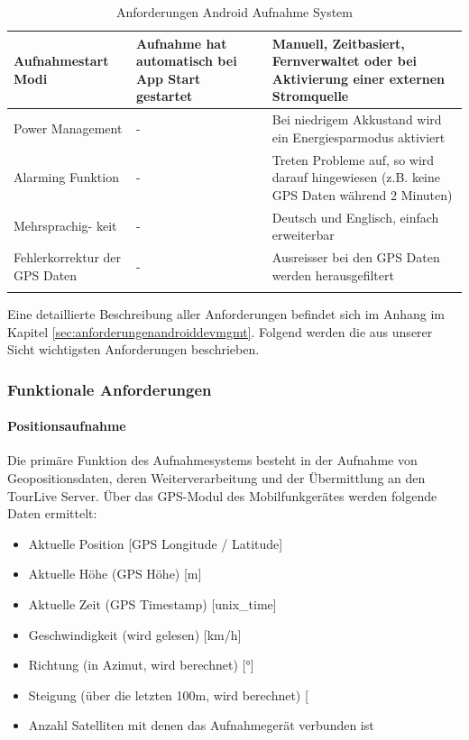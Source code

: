 {\begin{longtable}{  p{3.5cm} | p{4.3cm} | p{4.3cm} }
    \hline 
    Aufnahmestart Modi & Aufnahme hat automatisch bei App Start gestartet & Manuell, Zeitbasiert, Fernverwaltet oder bei Aktivierung einer externen Stromquelle\\
    \hline 
   	Power Management & - & Bei niedrigem Akkustand wird ein Energiesparmodus aktiviert\\
    \hline 
    Alarming Funktion & - & Treten Probleme auf, so wird darauf hingewiesen (z.B. keine GPS Daten w\"{a}hrend 2 Minuten)\\
    \hline 
    Mehrsprachig- keit & - & Deutsch und Englisch, einfach erweiterbar\\
    \hline 
    Fehlerkorrektur der GPS Daten & - & Ausreisser bei den GPS Daten werden herausgefiltert\\
    
    
\caption{Anforderungen Android Aufnahme System}
\end{longtable}}

Eine detaillierte Beschreibung aller Anforderungen befindet sich im Anhang im Kapitel \ref{sec:anforderungenandroiddevmgmt}. Folgend werden die aus unserer Sicht wichtigsten Anforderungen beschrieben.

\subsubsection{Funktionale Anforderungen}
\paragraph{Positionsaufnahme}
Die primäre Funktion des Aufnahmesystems besteht in der Aufnahme von Geopositionsdaten, deren Weiterverarbeitung und der Übermittlung an den TourLive Server. Über das GPS-Modul des Mobilfunkgerätes werden folgende Daten ermittelt:
\begin{itemize}
\item Aktuelle Position [GPS Longitude / Latitude]
\item Aktuelle H\"{o}he (GPS H\"{o}he) [m]
\item Aktuelle Zeit (GPS Timestamp) [unix\_time]
\item Geschwindigkeit (wird gelesen) [km/h]
\item Richtung (in Azimut, wird berechnet) [°]
\item Steigung (\"{u}ber die letzten 100m, wird berechnet) [%
\item Anzahl Satelliten mit denen das Aufnahmeger\"{a}t verbunden ist
\end{itemize}

